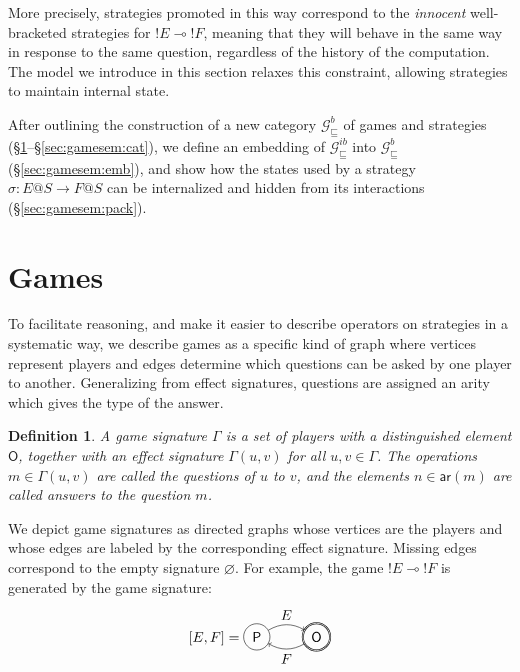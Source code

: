 \documentclass[draft,11pt]{report}
\newtheorem{definition}{Definition}
\newcommand{\gcat}{\mathcal{G}_{\sqsubseteq}}
\newcommand{\kw}[1]{\ensuremath{ \mathsf{#1} }}
\begin{document}
More precisely,
strategies promoted in this way
correspond to the \emph{innocent} well-bracketed strategies for
${!E} \multimap {!F}$,
meaning that they will behave in the same way
in response to the same question,
regardless of the history of the computation.
The model we introduce in this section
relaxes this constraint,
allowing strategies to maintain internal state.

After outlining the construction of a new category $\gcat^b$
of games and strategies
(\S\ref{sec:gamesem:games}--\S\ref{sec:gamesem:cat}),
we define an embedding of
$\gcat^{ib}$ into $\gcat^b$
(\S\ref{sec:gamesem:emb}),
and show how the states used by a strategy
$\sigma : E@S \rightarrow F@S$
can be internalized and
hidden from its interactions
(\S\ref{sec:gamesem:pack}).


\section{Games} \label{sec:gamesem:games} %

To facilitate reasoning,
and make it easier to describe operators on strategies
in a systematic way,
we describe games as a specific kind of graph
where vertices represent players
and edges determine which questions can be asked
by one player to another.
Generalizing from effect signatures,
questions are assigned an arity
which gives the type of the answer.

\begin{definition}
A \emph{game signature} $\Gamma$
is a set of players with a distinguished element $\kw{O}$,
together with an effect signature $\Gamma(u, v)$
for all $u, v \in \Gamma$.
The operations $m \in \Gamma(u, v)$ are called
the \emph{questions} of $u$ to $v$,
and the elements $n \in \kw{ar}(m)$ are called
\emph{answers} to the question $m$.
\end{definition}

We depict game signatures as directed graphs
whose vertices are the players and
whose edges are labeled by the corresponding effect signature.
Missing edges correspond to the empty signature $\varnothing$.
For example,
the game ${!E} \multimap {!F}$ is generated by
the game signature:
\[
  [E,F] =
  \begin{tikzpicture}[baseline=(O.base),scale=1.5]
    \node[circle,draw,double] (O) at (0,0) {$\kw{O}$};
    \node[circle,draw] (P) at (-1,0) {$\kw{P}$};
    \path[->] (P) edge[bend left] node[above] {$E$} (O);
    \path[->] (O) edge[bend left] node[below] {$F$} (P);
  \end{tikzpicture}
\]
\end{document}
